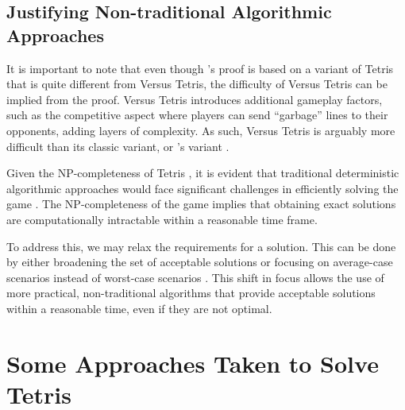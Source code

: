 \documentclass[a4paper, 12pt]{extreport}
\begin{document}
			\subsection{Justifying Non-traditional Algorithmic Approaches}
			
				
				It is important to note that even though \citeauthor{tetris-is-hard-even-to-approx}'s \cite{tetris-is-hard-even-to-approx} proof is based on a variant of Tetris that is quite different from Versus Tetris, the difficulty of Versus Tetris can be implied from the proof. Versus Tetris introduces additional gameplay factors, such as the competitive aspect where players can send ``garbage'' lines to their opponents, adding layers of complexity. As such, Versus Tetris is arguably more difficult than its classic variant, or  \citeauthor{tetris-is-hard-even-to-approx}'s variant \cite{tetris-is-hard-even-to-approx}.
				
				Given the NP-completeness of Tetris \cite{tetris-is-hard-even-to-approx} \cite{tetris-o1-np-hard}, it is evident that traditional deterministic algorithmic approaches would face significant challenges in efficiently solving the game \cite{cc:conceptual-perspective}. The NP-completeness of the game implies that obtaining exact solutions are computationally intractable within a reasonable time frame.
				
				To address this, we may relax the requirements for a solution. This can be done by either broadening the set of acceptable solutions or focusing on average-case scenarios instead of worst-case scenarios \cite{cc:conceptual-perspective}. This shift in focus allows the use of more practical, non-traditional algorithms that provide acceptable solutions within a reasonable time, even if they are not optimal. 
							
		\section{Some Approaches Taken to Solve Tetris}
		
\end{document}
